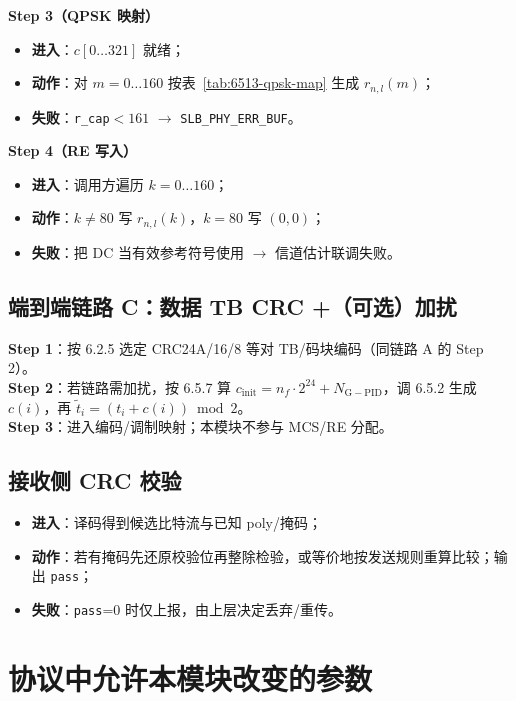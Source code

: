 \documentclass[11pt,a4paper]{ctexart}
\begin{document}
\textbf{Step 3（QPSK 映射）}
\begin{itemize}[nosep]
  \item \textbf{进入}：$c[0\ldots 321]$ 就绪；
  \item \textbf{动作}：对 $m{=}0\ldots 160$ 按表~\ref{tab:6513-qpsk-map} 生成 $r_{n,l}(m)$；
  \item \textbf{失败}：\texttt{r\_cap}${<}161$ $\rightarrow$ \texttt{SLB\_PHY\_ERR\_BUF}。
\end{itemize}

\textbf{Step 4（RE 写入）}
\begin{itemize}[nosep]
  \item \textbf{进入}：调用方遍历 $k{=}0\ldots 160$；
  \item \textbf{动作}：$k{\neq}80$ 写 $r_{n,l}(k)$，$k{=}80$ 写 $(0,0)$；
  \item \textbf{失败}：把 DC 当有效参考符号使用 $\rightarrow$ 信道估计联调失败。
\end{itemize}

\subsection{端到端链路 C：数据 TB CRC +（可选）加扰}

\textbf{Step 1}：按 6.2.5 选定 CRC24A/16/8 等对 TB/码块编码（同链路 A 的 Step 2）。\\
\textbf{Step 2}：若链路需加扰，按 6.5.7 算 $c_{\mathrm{init}}=n_f\cdot 2^{24}+N_{\mathrm{G-PID}}$，调 6.5.2 生成 $c(i)$，再 $\tilde{t}_i=(t_i+c(i))\bmod 2$。\\
\textbf{Step 3}：进入编码/调制映射；本模块不参与 MCS/RE 分配。

\subsection{接收侧 CRC 校验}

\begin{itemize}[nosep]
  \item \textbf{进入}：译码得到候选比特流与已知 poly/掩码；
  \item \textbf{动作}：若有掩码先还原校验位再整除检验，或等价地按发送规则重算比较；输出 \texttt{pass}；
  \item \textbf{失败}：\texttt{pass}{=}0 时仅上报，由上层决定丢弃/重传。
\end{itemize}

\section{协议中允许本模块改变的参数}
\end{document}
